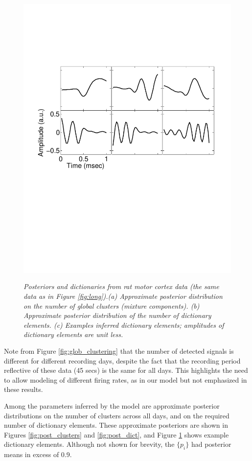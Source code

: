 \documentclass[journal]{IEEEtran}
\begin{document}
\begin{figure}[!htbp]
{   \includegraphics[width=1.0\linewidth] {figs_new/Dictionary_elements.pdf}
   \label{fig:dict_examples}
 }
  \caption{\small \emph{
{Posteriors and dictionaries from rat motor cortex data (the same data as in Figure} \ref{fig:long}).(a) Approximate posterior distribution on the number of global clusters (mixture components). (b) Approximate posterior distribution of the
number of dictionary elements. (c) Examples inferred
dictionary elements{; amplitudes of dictionary elements are unit less.} }}
\end{figure}


Note from Figure \ref{fig:glob_clustering} that the number of
detected signals is different for different recording days, despite
the fact that the recording period reflective of these data (45
secs) is the same for all days. This highlights the need to allow
modeling of different {firing} rates, as in our model but not
emphasized in these results.

Among the parameters inferred by the model are approximate posterior
distributions on the number of clusters across all days, and on the
required number of dictionary elements. These approximate posteriors
are shown in Figures \ref{fig:post_clusters}{ and }\ref{fig:post_dict},
and Figure \ref{fig:dict_examples} {shows } example dictionary
elements. Although not shown for brevity, the $\{p_i\}$ had posterior means in excess of 0.9.
\end{document}
